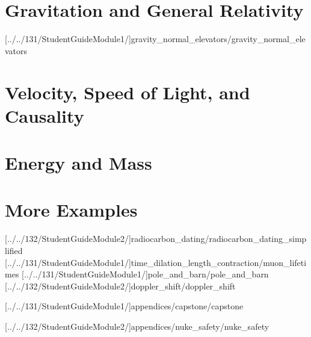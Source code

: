 \documentclass[english,twoside]{article}
\begin{document}
\part{Gravitation and General Relativity}

[../../131/StudentGuideModule1/]{gravity_normal_elevators/gravity_normal_elevators}

\part{Velocity, Speed of Light, and Causality}


\part{Energy and Mass}


\part{More Examples}

[../../132/StudentGuideModule2/]{radiocarbon_dating/radiocarbon_dating_simplified}
[../../131/StudentGuideModule1/]{time_dilation_length_contraction/muon_lifetimes}
[../../131/StudentGuideModule1/]{pole_and_barn/pole_and_barn} 
[../../132/StudentGuideModule2/]{doppler_shift/doppler_shift}


\startappendix
\renewcommand{\cftsecpresnum}{Appendix:~}


[../../131/StudentGuideModule1/]{appendices/capstone/capstone}

[../../132/StudentGuideModule2/]{appendices/nuke_safety/nuke_safety}
\setcounter{section}{12}
\renewcommand{\thesubsection}{\thesection\Alph{subsection}}

\end{document}

